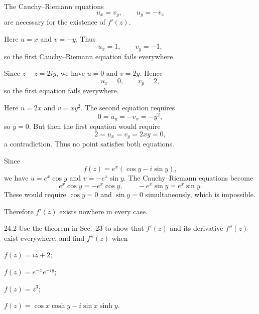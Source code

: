 \documentclass[11pt,oneside]{article}
\begin{document}
\begin{solution}
The Cauchy--Riemann equations
\[
    u_x=v_y,
    \qquad
    u_y=-v_x
\]
are necessary for the existence of \(f'(z)\).
\begin{exercisesubparts}
    \item Here \(u=x\) and \(v=-y\). Thus
    \[
        u_x=1,
        \qquad
        v_y=-1,
    \]
    so the first Cauchy--Riemann equation fails everywhere.

    \item Since \(z-\overline z=2iy\), we have \(u=0\) and \(v=2y\). Hence
    \[
        u_x=0,
        \qquad
        v_y=2,
    \]
    so the first equation fails everywhere.

    \item Here \(u=2x\) and \(v=xy^2\). The second equation requires
    \[
        0=u_y=-v_x=-y^2,
    \]
    so \(y=0\). But then the first equation would require
    \[
        2=u_x=v_y=2xy=0,
    \]
    a contradiction. Thus no point satisfies both equations.

    \item Since
    \[
        f(z)=e^x(\cos y-i\sin y),
    \]
    we have \(u=e^x\cos y\) and \(v=-e^x\sin y\). The Cauchy--Riemann equations become
    \[
        e^x\cos y=-e^x\cos y,
        \qquad
        -e^x\sin y=e^x\sin y.
    \]
    These would require \(\cos y=0\) and \(\sin y=0\) simultaneously, which is impossible.
\end{exercisesubparts}
Therefore \(f'(z)\) exists nowhere in every case.
\end{solution}

\begin{exercise}{24.2}
Use the theorem in Sec.~23 to show that \(f'(z)\) and its derivative \(f''(z)\) exist everywhere, and find \(f''(z)\) when
\begin{exercisesubparts}
    \item \(f(z)=iz+2\);
    \item \(f(z)=e^{-x}e^{-iy}\);
    \item \(f(z)=z^3\);
    \item \(f(z)=\cos x\cosh y-i\sin x\sinh y\).
\end{exercisesubparts}
\end{exercise}
\end{document}
